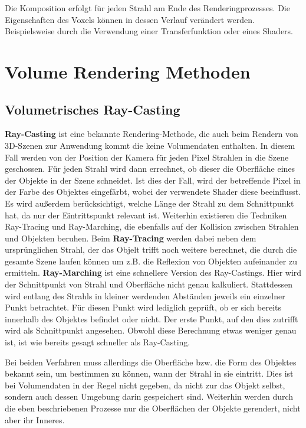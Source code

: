 Die Komposition erfolgt für jeden Strahl am Ende des Renderingprozesses. Die Eigenschaften des Voxels können in dessen Verlauf verändert werden. Beispielsweise durch die Verwendung einer Transferfunktion oder eines Shaders.


\section{Volume Rendering Methoden}

\subsection{Volumetrisches Ray-Casting}
\label{rayCasting}

\textbf{Ray-Casting} ist eine bekannte Rendering-Methode, die auch beim Rendern von 3D-Szenen zur Anwendung kommt die keine Volumendaten enthalten.
In diesem Fall werden von der Position der Kamera für jeden Pixel Strahlen in die Szene geschossen. Für jeden Strahl wird dann errechnet, ob dieser die Oberfläche eines der Objekte in der Szene schneidet. Ist dies der Fall, wird der betreffende Pixel in der Farbe des Objektes eingefärbt, wobei der verwendete Shader diese beeinflusst. Es wird außerdem berücksichtigt, welche Länge der Strahl zu dem Schnittpunkt hat, da nur der Eintrittspunkt relevant ist.
Weiterhin existieren die Techniken Ray-Tracing und Ray-Marching, die ebenfalls auf der Kollision zwischen Strahlen und Objekten beruhen.
Beim \textbf{Ray-Tracing} werden dabei neben dem ursprünglichen Strahl, der das Objelt trifft noch weitere berechnet, die durch die gesamte Szene laufen können um z.B. die Reflexion von Objekten aufeinander zu ermitteln. 
\textbf{Ray-Marching} ist eine schnellere Version des Ray-Castings. Hier wird der Schnittpunkt von Strahl und Oberfläche nicht genau kalkuliert. Stattdessen wird entlang des Strahls in kleiner werdenden Abständen jeweils ein einzelner Punkt betrachtet. Für diesen Punkt wird lediglich geprüft, ob er sich bereits innerhalb des Objektes befindet oder nicht. Der erste Punkt, auf den dies zutrifft wird als Schnittpunkt angesehen. Obwohl diese Berechnung etwas weniger genau ist, ist wie bereits gesagt schneller als Ray-Casting.

Bei beiden Verfahren muss allerdings die Oberfläche bzw. die Form des Objektes bekannt sein, um bestimmen zu können, wann der Strahl in sie eintritt. Dies ist bei Volumendaten in der Regel nicht gegeben, da nicht zur das Objekt selbst, sondern auch dessen Umgebung darin gespeichert sind. Weiterhin werden durch die eben beschriebenen Prozesse nur die Oberflächen der Objekte gerendert, nicht aber ihr Inneres.


